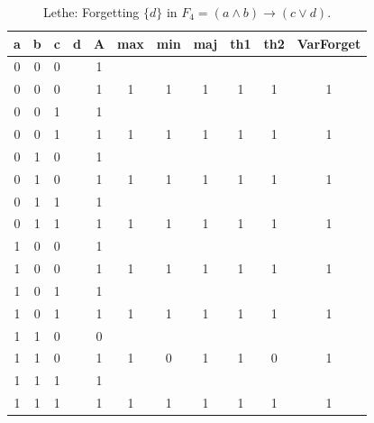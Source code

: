 \begin{table}[!tb]
    \centering
    \begin{tabular}{|c|c|c|c|c|c|c|c|c|c|c|}
        \hline
        \textbf{a} & \textbf{b} & \textbf{c} & \textbf{d} & \textbf{A} & \textbf{max} & \textbf{min} & \textbf{maj} & \textbf{th1} & \textbf{th2} & \textbf{VarForget} \\ \hline
        \rowcolor{gray!40} 0 & 0 & 0 &  & 1 &  &  &  &  &  &  \\ \hline
        \rowcolor{gray!40} 0 & 0 & 0 &  & 1 & 1 & 1 & 1 & 1 & 1 & 1 \\ \hline
        \rowcolor{blue!40} 0 & 0 & 1 &  & 1 &  &  &  &  &  &  \\ \hline
        \rowcolor{blue!40} 0 & 0 & 1 &  & 1 & 1 & 1 & 1 & 1 & 1 & 1 \\ \hline
        \rowcolor{red!40} 0 & 1 & 0 &  & 1 &  &  &  &  &  &  \\ \hline
        \rowcolor{red!40} 0 & 1 & 0 &  & 1 & 1 & 1 & 1 & 1 & 1 & 1 \\ \hline
        \rowcolor{green!40} 0 & 1 & 1 &  & 1 &  &  &  &  &  &  \\ \hline
        \rowcolor{green!40} 0 & 1 & 1 &  & 1 & 1 & 1 & 1 & 1 & 1 & 1 \\ \hline
        \rowcolor{yellow!40} 1 & 0 & 0 &  & 1 &  &  &  &  &  &  \\ \hline
        \rowcolor{yellow!40} 1 & 0 & 0 &  & 1 & 1 & 1 & 1 & 1 & 1 & 1 \\ \hline
        \rowcolor{gray!40} 1 & 0 & 1 &  & 1 &  &  &  &  &  &  \\ \hline
        \rowcolor{gray!40} 1 & 0 & 1 &  & 1 & 1 & 1 & 1 & 1 & 1 & 1 \\ \hline
        \rowcolor{blue!40} 1 & 1 & 0 &  & 0 &  &  &  &  &  &  \\ \hline
        \rowcolor{blue!40} 1 & 1 & 0 &  & 1 & 1 & 0 & 1 & 1 & 0 & 1 \\ \hline
        \rowcolor{red!40} 1 & 1 & 1 &  & 1 &  &  &  &  &  &  \\ \hline
        \rowcolor{red!40} 1 & 1 & 1 &  & 1 & 1 & 1 & 1 & 1 & 1 & 1 \\ \hline
    \end{tabular}
    \caption{Lethe: Forgetting $\{d\}$ in $F_{4} = (a \land b) \rightarrow (c \lor d)$.}
    \label{tab:lethe-F4-d}
\end{table}

